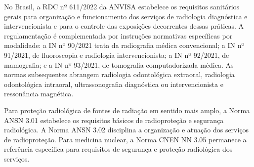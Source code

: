No Brasil, a RDC nº 611/2022 da ANVISA estabelece os requisitos sanitários gerais para organização e funcionamento dos serviços de radiologia diagnóstica e intervencionista e para o controle das exposições decorrentes dessas práticas\supercite{anvisa_rdc611_2022}. A regulamentação é complementada por instruções normativas específicas por modalidade: a IN nº 90/2021 trata da radiografia médica convencional\supercite{anvisa_in90_2021}; a IN nº 91/2021, de fluoroscopia e radiologia intervencionista\supercite{anvisa_in91_2021}; a IN nº 92/2021, de mamografia\supercite{anvisa_in92_2021}; e a IN nº 93/2021, de tomografia computadorizada médica\supercite{anvisa_in93_2021}. As normas subsequentes abrangem radiologia odontológica extraoral\supercite{anvisa_in94_2021}, radiologia odontológica intraoral\supercite{anvisa_in95_2021}, ultrassonografia diagnóstica ou intervencionista\supercite{anvisa_in96_2021} e ressonância magnética\supercite{anvisa_in97_2021}.

Para proteção radiológica de fontes de radiação em sentido mais amplo, a Norma ANSN 3.01 estabelece os requisitos básicos de radioproteção e segurança radiológica\supercite{ansn301_2025}. A Norma ANSN 3.02 disciplina a organização e atuação dos serviços de radioproteção\supercite{ansn302_2026}. Para medicina nuclear, a Norma CNEN NN 3.05 permanece a referência específica para requisitos de segurança e proteção radiológica dos serviços\supercite{cnen305_2013}.


